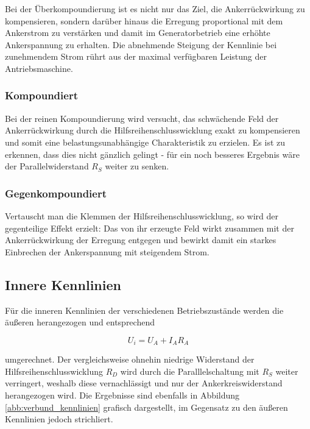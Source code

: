Bei der Überkompoundierung ist es nicht nur das Ziel, die Ankerrückwirkung zu kompensieren, sondern darüber hinaus die Erregung proportional mit dem Ankerstrom zu verstärken und damit im Generatorbetrieb eine erhöhte Ankerspannung zu erhalten. Die abnehmende Steigung der Kennlinie bei zunehmendem Strom rührt aus der maximal verfügbaren Leistung der Antriebsmaschine. 

\subsubsection{Kompoundiert}

Bei der reinen Kompoundierung wird versucht, das schwächende Feld der Ankerrückwirkung durch die Hilfsreihenschlusswicklung exakt zu kompensieren und somit eine belastungsunabhängige Charakteristik zu erzielen. Es ist zu erkennen, dass dies nicht gänzlich gelingt - für ein noch besseres Ergebnis wäre der Parallelwiderstand $R_S$ weiter zu senken. 

\subsubsection{Gegenkompoundiert}

Vertauscht man die Klemmen der Hilfsreihenschlusswicklung, so wird der gegenteilige Effekt erzielt: Das von ihr erzeugte Feld wirkt zusammen mit der Ankerrückwirkung der Erregung entgegen und bewirkt damit ein starkes Einbrechen der Ankerspannung mit steigendem Strom.

\subsection{Innere Kennlinien}

Für die inneren Kennlinien der verschiedenen Betriebszustände werden die äußeren herangezogen und entsprechend 

\begin{equation}
U_i=U_A+I_A R_A
\end{equation}

\noindent umgerechnet. Der vergleichsweise ohnehin niedrige Widerstand der Hilfsreihenschlusswicklung $R_D$ wird durch die Paralllelschaltung mit $R_S$ weiter verringert, weshalb diese vernachlässigt und nur der Ankerkreiswiderstand herangezogen wird. Die Ergebnisse sind ebenfalls in Abbildung \ref{abb:verbund_kennlinien} grafisch dargestellt, im Gegensatz zu den äußeren Kennlinien jedoch strichliert.


%